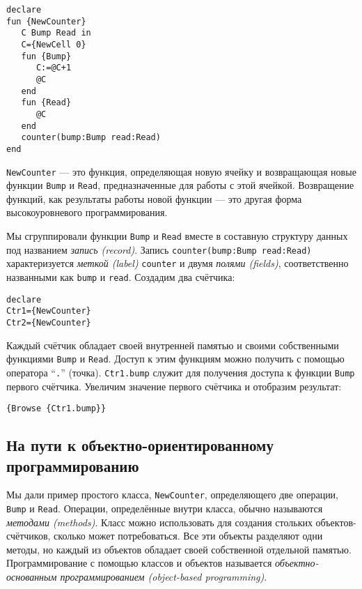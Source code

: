 \begin{lstlisting}
declare
fun {NewCounter}
   C Bump Read in
   C={NewCell 0}
   fun {Bump}
      C:=@C+1
      @C
   end
   fun {Read}
      @C
   end
   counter(bump:Bump read:Read)
end
\end{lstlisting}

\lstinline|NewCounter| --- это функция, определяющая новую ячейку и возвращающая новые функции \lstinline|Bump| и \lstinline|Read|, предназначенные для работы с этой ячейкой. Возвращение функций, как результаты работы новой функции --- это другая форма высокоуровневого программирования.

Мы сгруппировали функции \lstinline|Bump| и \lstinline|Read| вместе в составную структуру данных под названием \emph{запись (record)}. Запись \lstinline|counter(bump:Bump read:Read)| характеризуется \emph{меткой (label)} \lstinline|counter| и двумя \emph{полями (fields)}, соответственно названными как \lstinline|bump| и \lstinline|read|. Создадим два счётчика:

\begin{lstlisting}
declare
Ctr1={NewCounter}
Ctr2={NewCounter}
\end{lstlisting}

Каждый счётчик обладает своей внутренней памятью и своими собственными функциями \lstinline|Bump| и \lstinline|Read|. Доступ к этим функциям можно получить с помощью оператора ``\lstinline|.|'' (точка). \lstinline|Ctr1.bump| служит для получения доступа к функции \lstinline|Bump| первого счётчика. Увеличим значение первого счётчика и отобразим результат:

\begin{lstlisting}
{Browse {Ctr1.bump}}
\end{lstlisting}

\subsection{На пути к объектно-ориентированному программированию}

Мы дали пример простого класса, \lstinline|NewCounter|, определяющего две операции, \lstinline|Bump| и \lstinline|Read|. Операции, определённые внутри класса, обычно называются \emph{методами (methods)}. Класс можно использовать для создания стольких объектов-счётчиков, сколько может потребоваться. Все эти объекты разделяют одни методы, но каждый из объектов обладает своей собственной отдельной памятью. Программирование с помощью классов и объектов называется \emph{объектно-основанным программированием (object-based programming)}.

